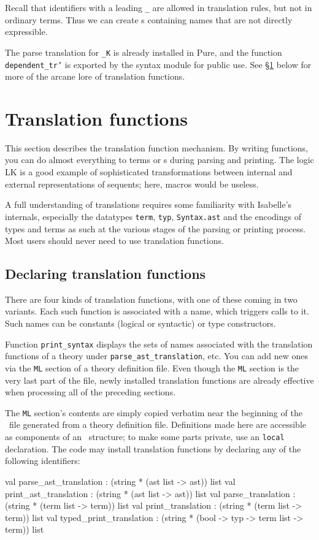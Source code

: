 Recall that identifiers with a leading {\tt _} are allowed in translation
rules, but not in ordinary terms.  Thus we can create \AST{}s containing
names that are not directly expressible.

The parse translation for {\tt _K} is already installed in Pure, and the
function {\tt dependent_tr'} is exported by the syntax module for public use.
See \S\ref{sec:tr_funs} below for more of the arcane lore of translation
functions.  


\section{Translation functions} \label{sec:tr_funs}
%
This section describes the translation function mechanism.  By writing \ML{}
functions, you can do almost everything to terms or \AST{}s during parsing and
printing.  The logic LK is a good example of sophisticated transformations
between internal and external representations of sequents; here, macros would
be useless.

A full understanding of translations requires some familiarity
with Isabelle's internals, especially the datatypes {\tt term}, {\tt typ},
{\tt Syntax.ast} and the encodings of types and terms as such at the various
stages of the parsing or printing process.  Most users should never need to
use translation functions.

\subsection{Declaring translation functions}
There are four kinds of translation functions, with one of these
coming in two variants.  Each such function is associated with a name,
which triggers calls to it.  Such names can be constants (logical or
syntactic) or type constructors.

Function {\tt print_syntax} displays the sets of names associated with the
translation functions of a theory under \texttt{parse_ast_translation}, etc.
You can add new ones via the {\tt ML} section of a theory
definition file.  Even though the {\tt ML} section is the very last part of
the file, newly installed translation functions are already effective when
processing all of the preceding sections.

The {\tt ML} section's contents are simply copied verbatim near the
beginning of the \ML\ file generated from a theory definition file.
Definitions made here are accessible as components of an \ML\ 
structure; to make some parts private, use an \ML{} {\tt local}
declaration.  The {\ML} code may install translation functions by
declaring any of the following identifiers:
\begin{ttbox}
val parse_ast_translation   : (string * (ast list -> ast)) list
val print_ast_translation   : (string * (ast list -> ast)) list
val parse_translation       : (string * (term list -> term)) list
val print_translation       : (string * (term list -> term)) list
val typed_print_translation :
    (string * (bool -> typ -> term list -> term)) list
\end{ttbox}

